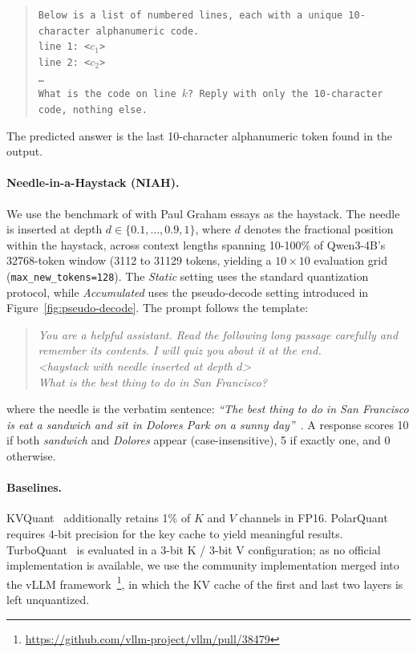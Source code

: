\documentclass{article}
\begin{document}
\begin{quote}\small
\texttt{Below is a list of numbered lines, each with a unique 10-character alphanumeric code.}\\
\texttt{line 1: <$c_1$>}\\
\texttt{line 2: <$c_2$>}\\
\texttt{\ldots}\\[2pt]
\texttt{What is the code on line $k$? Reply with only the 10-character code, nothing else.}
\end{quote}

The predicted answer is the last 10-character alphanumeric token found in the output.

\paragraph{Needle-in-a-Haystack (NIAH).}
We use the benchmark of \cite{kamradt2023needle} with Paul Graham essays as the haystack. The needle is inserted at depth $d \in \{0.1, \ldots, 0.9, 1\}$, where $d$ denotes the fractional position within the haystack, across context lengths spanning 10-100\% of Qwen3-4B's \num{32768}-token window (\num{3112} to \num{31129} tokens, yielding a $10{\times}10$ evaluation grid (\texttt{max\_new\_tokens=128}). The \textit{Static} setting uses the standard quantization protocol, while \textit{Accumulated} uses the pseudo-decode setting introduced in Figure~\ref{fig:pseudo-decode}. The prompt follows the template:

\begin{quote}\small
\textit{You are a helpful assistant. Read the following long passage carefully and remember its contents. I will quiz you about it at the end.}\\[2pt]
\textit{<haystack with needle inserted at depth $d$>}\\[2pt]
\textit{What is the best thing to do in San Francisco?}
\end{quote}

\noindent where the needle is the verbatim sentence: \emph{``The best thing to do in San Francisco is eat a sandwich and sit in Dolores Park on a sunny day''}~\citep{kamradt2023needle}. A response scores 10 if both \emph{sandwich} and \emph{Dolores} appear (case-insensitive), 5 if exactly one, and 0 otherwise.

\paragraph{Baselines.}
KVQuant~\citep{hooper2024kvquant} additionally retains 1\% of $K$ and $V$ channels in FP16. PolarQuant~\citep{wu2026polarquant} requires 4-bit precision for the key cache to yield meaningful results. TurboQuant~\citep{zandieh2026turboquant} is evaluated in a 3-bit K / 3-bit V configuration; as no official implementation is available, we use the community implementation merged into the vLLM framework~\citep{kwon2023efficientvLLM}\footnote{\url{https://github.com/vllm-project/vllm/pull/38479}}, in which the KV cache of the first and last two layers is left unquantized.
\end{document}
